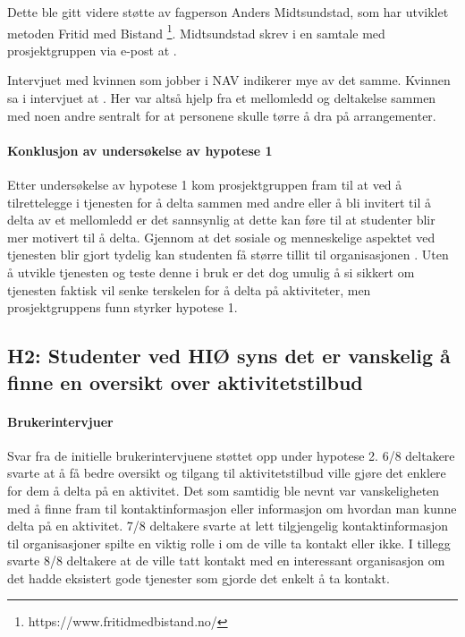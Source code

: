 Dette ble gitt videre støtte av fagperson Anders Midtsundstad, som har utviklet metoden Fritid med Bistand \footnote{https://www.fritidmedbistand.no/}. Midtsundstad skrev i en samtale med prosjektgruppen via e-post at  \cite{MIDTSUNDSTAD-EPOST:14}. 

Intervjuet med kvinnen som jobber i NAV indikerer mye av det samme. Kvinnen sa i intervjuet at  \cite{NAV-INTERVJU:16}. Her var altså hjelp fra et mellomledd og deltakelse sammen med noen andre sentralt for at personene skulle tørre å dra på arrangementer. 

\paragraph{Konklusjon av undersøkelse av hypotese 1}
Etter undersøkelse av hypotese 1 kom prosjektgruppen fram til at ved å tilrettelegge i tjenesten for å delta sammen med andre eller å bli invitert til å delta av et mellomledd er det sannsynlig at dette kan føre til at studenter blir mer motivert til å delta. Gjennom at det sosiale og menneskelige aspektet ved tjenesten blir gjort tydelig kan studenten få større tillit til organisasjonen \cite{MIDTSUNDSTAD-EPOST:14}. Uten å utvikle tjenesten og teste denne i bruk er det dog umulig å si sikkert om tjenesten faktisk vil senke terskelen for å delta på aktiviteter, men prosjektgruppens funn styrker hypotese 1.

\subsection{H2: Studenter ved HIØ syns det er vanskelig å finne en oversikt over aktivitetstilbud}

\paragraph{Brukerintervjuer}
Svar fra de initielle brukerintervjuene støttet opp under hypotese 2. 6/8 deltakere svarte at å få bedre oversikt og tilgang til aktivitetstilbud ville gjøre det enklere for dem å delta på en aktivitet. Det som samtidig ble nevnt var vanskeligheten med å finne fram til kontaktinformasjon eller informasjon om hvordan man kunne delta på en aktivitet. 7/8 deltakere svarte at lett tilgjengelig kontaktinformasjon til organisasjoner spilte en viktig rolle i om de ville ta kontakt eller ikke. I tillegg svarte 8/8 deltakere at de ville tatt kontakt med en interessant organisasjon om det hadde eksistert gode tjenester som gjorde det enkelt å ta kontakt.

